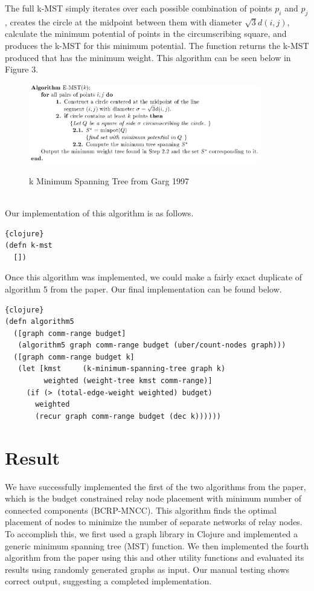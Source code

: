 \documentclass{article}
\begin{document}
The full k-MST simply iterates over each possible combination of points $p_i$ and $p_j$, creates the circle at the midpoint between them with diameter $\sqrt{3}d(i,j)$, calculate the minimum potential of points in the circumscribing square, and produces the k-MST for this minimum potential.
The function returns the k-MST produced that has the minimum weight.
This algorithm can be seen below in Figure 3.

\begin{figure}[h]
\centering
\includegraphics[width=0.9\textwidth]{k-mst.png}
\label{k-MST}
\caption{k Minimum Spanning Tree from Garg 1997}
\end{figure}\\

Our implementation of this algorithm is as follows.

\begin{lstlisting}{clojure}
(defn k-mst
  [])
\end{lstlisting}

Once this algorithm was implemented, we could make a fairly exact duplicate of algorithm 5 from the paper.
Our final implementation can be found below.


\begin{lstlisting}{clojure}
(defn algorithm5
  ([graph comm-range budget]
   (algorithm5 graph comm-range budget (uber/count-nodes graph)))
  ([graph comm-range budget k]
   (let [kmst     (k-minimum-spanning-tree graph k)
         weighted (weight-tree kmst comm-range)]
     (if (> (total-edge-weight weighted) budget)
       weighted
       (recur graph comm-range budget (dec k))))))
\end{lstlisting}

\section{Result}
We have successfully implemented the first of the two algorithms from the paper, which is the budget constrained relay node placement with minimum number of connected components (BCRP-MNCC).
This algorithm finds the optimal placement of nodes to minimize the number of separate networks of relay nodes.
To accomplish this, we first used a graph library in Clojure and implemented a generic minimum spanning tree (MST) function.
We then implemented the fourth algorithm from the paper using this and other utility functions and evaluated its results using randomly generated graphs as input.
Our manual testing shows correct output, suggesting a completed implementation.
\end{document}
